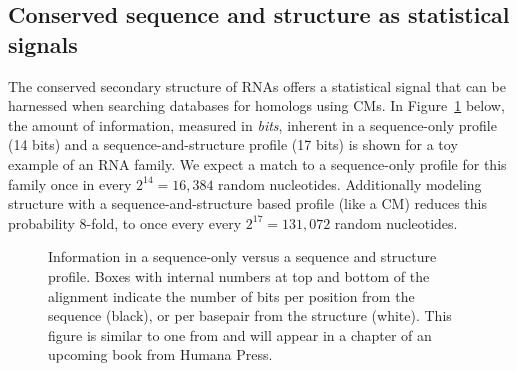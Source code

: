 \documentclass[custom,landscape,final,30pt,plainboxedsections]{sciposter-titleskipsmall}
\begin{document}
\begin{multicols}{3}
\columnbreak

\section*{Conserved sequence and structure as statistical signals}
The conserved secondary structure of RNAs offers a
statistical signal that can be harnessed when searching
databases for homologs using CMs. In
Figure~\ref{fig:seqstructprofiles} below, the amount of information,
measured in \emph{bits}, inherent in a sequence-only profile (14
bits) and a sequence-and-structure profile (17 bits) is shown for a
toy example of an RNA family. We expect a match to a sequence-only
profile for this family once in every $2^{14}=16,384$ random
nucleotides.  Additionally modeling structure with a
sequence-and-structure based profile (like a CM) reduces this
probability 8-fold, to once every every $2^{17}=131,072$
random nucleotides.

\begin{footnotesize}
\begin{figure}
\caption{Information in a sequence-only versus a sequence and
  structure profile. 
  Boxes with internal numbers at top and bottom of
  the alignment indicate the number of bits per position from the
  sequence (black), or per basepair from the structure (white).
  This figure is similar to one from \cite{Eddy06b} and 
  will appear in a chapter of an upcoming book from Humana Press.
}
\label{fig:seqstructprofiles}
\end{figure}
\end{footnotesize}


\end{multicols}
\end{document}
